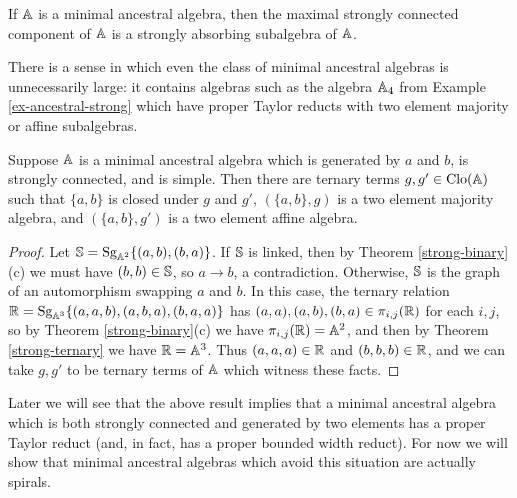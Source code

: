 \documentclass[letterpaper,11pt]{article}
\DeclareMathOperator{\Clo}{Clo}
\DeclareMathOperator{\Sg}{Sg}
\DeclareMathOperator{\Con}{Con}
\begin{document}
\begin{cor}\label{minimal-ancestral-maximal} If $\mathbb{A}$ is a minimal ancestral algebra, then the maximal strongly connected component of $\mathbb{A}$ is a strongly absorbing subalgebra of $\mathbb{A}$.
\end{cor}

There is a sense in which even the class of minimal ancestral algebras is unnecessarily large: it contains algebras such as the algebra $\mathbb{A}_4$ from Example \ref{ex-ancestral-strong} which have proper Taylor reducts with two element majority or affine subalgebras.

\begin{thm} Suppose $\mathbb{A}$ is a minimal ancestral algebra which is generated by $a$ and $b$, is strongly connected, and is simple. Then there are ternary terms $g,g' \in \Clo(\bA)$ such that $\{a,b\}$ is closed under $g$ and $g'$, $(\{a,b\},g)$ is a two element majority algebra, and $(\{a,b\},g')$ is a two element affine algebra.
\end{thm}
\begin{proof} Let $\bS = \Sg_{\bA^2}\{(a,b),(b,a)\}$. If $\mathbb{S}$ is linked, then by Theorem \ref{strong-binary}(c) we must have $(b,b) \in \mathbb{S}$, so $a \rightarrow b$, a contradiction. Otherwise, $\mathbb{S}$ is the graph of an automorphism swapping $a$ and $b$. In this case, the ternary relation $\RR = \Sg_{\bA^3}\{(a,a,b),(a,b,a),(b,a,a)\}$ has $(a,a),(a,b),(b,a) \in \pi_{i,j}(\mathbb{R})$ for each $i,j$, so by Theorem \ref{strong-binary}(c) we have $\pi_{i,j}(\mathbb{R}) = \mathbb{A}^2$, and then by Theorem \ref{strong-ternary} we have $\mathbb{R} = \mathbb{A}^3$. Thus $(a,a,a) \in \mathbb{R}$ and $(b,b,b) \in \mathbb{R}$, and we can take $g,g'$ to be ternary terms of $\mathbb{A}$ which witness these facts.%
\end{proof}

Later we will see that the above result implies that a minimal ancestral algebra which is both strongly connected and generated by two elements has a proper Taylor reduct (and, in fact, has a proper bounded width reduct). For now we will show that minimal ancestral algebras which avoid this situation are actually spirals.
\end{document}
